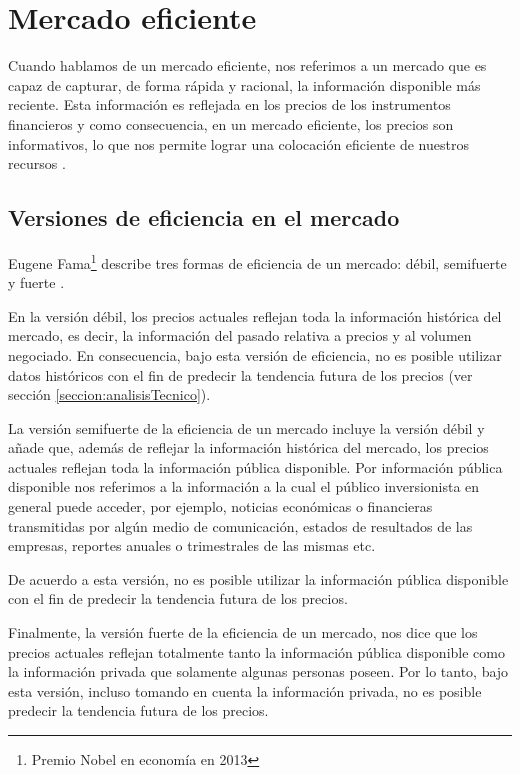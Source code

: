 \documentclass[12pt]{scrbook}
\theoremstyle{break}
\theoremstyle{break}
\begin{document}
\section{Mercado eficiente}
\label{seccion:mercado eficiente}
Cuando hablamos de un mercado eficiente, nos referimos a un mercado que es capaz de capturar, de forma rápida y racional, la información disponible más reciente. Esta información es reflejada en los precios de los instrumentos financieros y como consecuencia, en un mercado eficiente, los precios son informativos, lo que nos permite lograr una colocación eficiente de nuestros recursos \cite{CFA2019}.

\subsection{Versiones de eficiencia en el mercado}
\label{subseccion:versiones emh}
Eugene Fama\footnote{Premio Nobel en economía en 2013} describe tres formas de eficiencia de un mercado: débil, semifuerte y fuerte \cite{Fama1965}.

En la versión débil, los precios actuales reflejan toda la información histórica del mercado, es decir, la información del pasado relativa a precios y al volumen negociado. En consecuencia, bajo esta versión de eficiencia, no es posible utilizar datos históricos con el fin de predecir la tendencia futura de los precios (ver sección \ref{seccion:analisisTecnico}).

La versión semifuerte de la eficiencia de un mercado incluye la versión débil y añade que, además de reflejar la información histórica del mercado, los precios actuales reflejan toda la información pública disponible. Por información pública disponible nos referimos a la información a la cual el público inversionista en general puede acceder, por ejemplo, noticias económicas o financieras transmitidas por algún medio de comunicación, estados de resultados de las empresas, reportes anuales o trimestrales de las mismas etc.

De acuerdo a esta versión, no es posible utilizar la información pública disponible con el fin de predecir la tendencia futura de los precios.

Finalmente, la versión fuerte de la eficiencia de un mercado, nos dice que los precios actuales reflejan totalmente tanto la información pública disponible como la información privada que solamente algunas personas poseen. Por lo tanto, bajo esta versión, incluso tomando en cuenta la información privada, no es posible predecir la tendencia futura de los precios.
\end{document}
